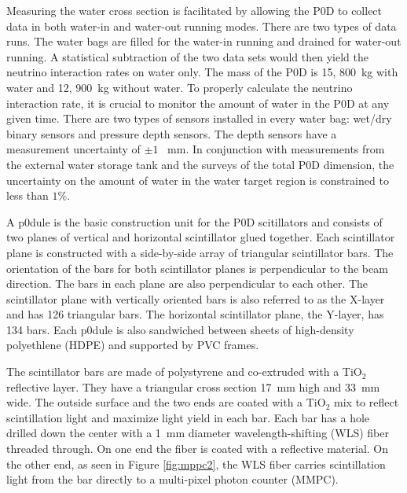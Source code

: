 Measuring the water cross section is facilitated by allowing the P0D to collect
data in both water-in and water-out running modes. There are two types of data runs. The water bags are filled
for the water-in running and drained for water-out running. A
statistical subtraction of the two data sets would then yield the neutrino
interaction rates on water only. The mass of the P0D is 15, 800~kg
with water and 12, 900~kg without water. To properly calculate the
neutrino interaction rate, it is crucial to monitor the
amount of water in the P0D at any given time. There are two types of
sensors installed in every water bag: wet/dry binary sensors and pressure depth
sensors. The depth sensors have a measurement uncertainty of $\pm
1$ ~mm. In conjunction with measurements from the external water
storage tank and the surveys of the total P0D dimension, the
uncertainty on the amount of water in the water target region is
constrained to less than $1\%$.

A p0dule is the basic
construction unit for the P0D scitillators and consists of two planes of vertical and horizontal
scintillator glued together. Each scintillator plane is constructed
with a side-by-side array of triangular scintillator bars. The
orientation of the bars for both scintillator planes is perpendicular
to the beam direction. The bars in each plane are also perpendicular
to each other. The scintillator plane with vertically oriented bars is
also referred to as the X-layer and has 126 triangular bars. The
horizontal scintillator plane, the Y-layer, has 134 bars. Each p0dule
is also sandwiched between sheets of high-density polyethlene (HDPE)
and supported by PVC frames.

The scintillator bars are made of polystyrene and co-extruded with a
TiO$_2$ reflective layer. They have a triangular cross section 17~mm
high and 33~mm wide. The outside surface and the two ends are coated
with a TiO$_2$ mix to reflect scintillation light and maximize light
yield in each bar. Each bar has a hole drilled down the center
with a 1~mm diameter wavelength-shifting (WLS) fiber threaded
through. On one end the fiber is coated with a reflective material. On
the other end, as seen in Figure \ref{fig:mppc2}, the WLS fiber carries scintillation light from the bar
directly to a multi-pixel photon counter (MMPC).

